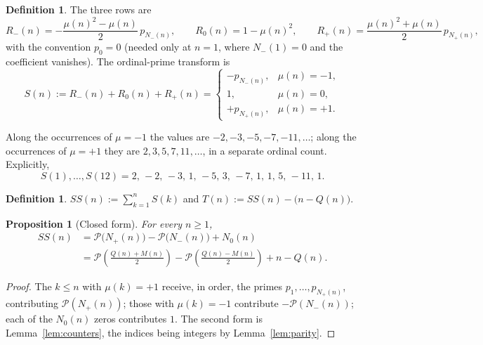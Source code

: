 \documentclass[11pt]{amsart}
\numberwithin{equation}{section}
\theoremstyle{plain}
\newtheorem{proposition}[theorem]{Proposition}
\theoremstyle{definition}
\newtheorem{definition}[theorem]{Definition}
\theoremstyle{remark}
\newcommand{\mob}{\mu}
\newcommand{\Mert}{M}
\newcommand{\Sq}{Q}
\newcommand{\PS}{\mathcal P}
\begin{document}
\begin{definition}
\label{def:transform}
The three rows are
\begin{equation}
\label{eq:transform-rows}
R_-(n)=-\frac{\mob(n)^2-\mob(n)}2\,p_{N_-(n)},
\qquad
R_0(n)=1-\mob(n)^2,
\qquad
R_+(n)=\frac{\mob(n)^2+\mob(n)}2\,p_{N_+(n)} ,
\end{equation}
with the convention $p_0=0$ (needed only at $n=1$, where $N_-(1)=0$ and the
coefficient vanishes). The ordinal-prime transform is
\begin{equation}
\label{eq:transform-piecewise}
S(n):=R_-(n)+R_0(n)+R_+(n)
=
\begin{cases}
-p_{N_-(n)},&\mob(n)=-1,\\[1mm]
1,&\mob(n)=0,\\[1mm]
+p_{N_+(n)},&\mob(n)=+1 .
\end{cases}
\end{equation}
\end{definition}

Along the occurrences of $\mob=-1$ the values are $-2,-3,-5,-7,-11,\ldots$; along
the occurrences of $\mob=+1$ they are $2,3,5,7,11,\ldots$, in a separate ordinal
count. Explicitly,
\begin{equation}
\label{eq:first-transform-values}
S(1),\ldots,S(12)=2,\,-2,\,-3,\,1,\,-5,\,3,\,-7,\,1,\,1,\,5,\,-11,\,1 .
\end{equation}

\begin{definition}
\label{def:ss-t}
$SS(n):=\sum_{k=1}^{n}S(k)$ and $T(n):=SS(n)-\bigl(n-\Sq(n)\bigr)$.
\end{definition}

\begin{proposition}[Closed form]\label{prop:closed}
For every $n\ge1$,
\begin{equation}
\label{eq:closed-form}
\boxed{\begin{aligned}
SS(n)&=\PS\bigl(N_+(n)\bigr)-\PS\bigl(N_-(n)\bigr)+N_0(n)\\
&=\PS\!\left(\frac{\Sq(n)+\Mert(n)}2\right)
-\PS\!\left(\frac{\Sq(n)-\Mert(n)}2\right)+n-\Sq(n).
\end{aligned}}
\end{equation}
\end{proposition}

\begin{proof}
The $k\le n$ with $\mob(k)=+1$ receive, in order, the primes
$p_1,\dots,p_{N_+(n)}$, contributing $\PS(N_+(n))$; those with $\mob(k)=-1$
contribute $-\PS(N_-(n))$; each of the $N_0(n)$ zeros contributes $1$. The
second form is Lemma~\ref{lem:counters}, the indices being integers by
Lemma~\ref{lem:parity}.
\end{proof}
\end{document}
